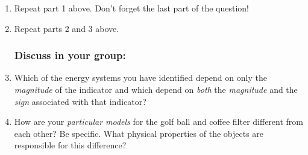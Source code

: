 \begin{enumerate}
	\item Repeat part 1 above. Don't forget the last part of the question!
	\item Repeat parts 2 and 3 above.

\WCD 

\subsubsection*{Discuss in your group:}
	
	\item Which of the energy systems you have identified depend on only the \emph{magnitude} of the indicator and which depend on {\em both} the \emph{magnitude} and the \emph{sign} associated with that indicator? 
	\item How are your {\em particular models} for the golf ball and coffee filter different from each other?  Be specific.  What physical properties of the objects are responsible for this difference?
	
\end{enumerate}

\WCD 